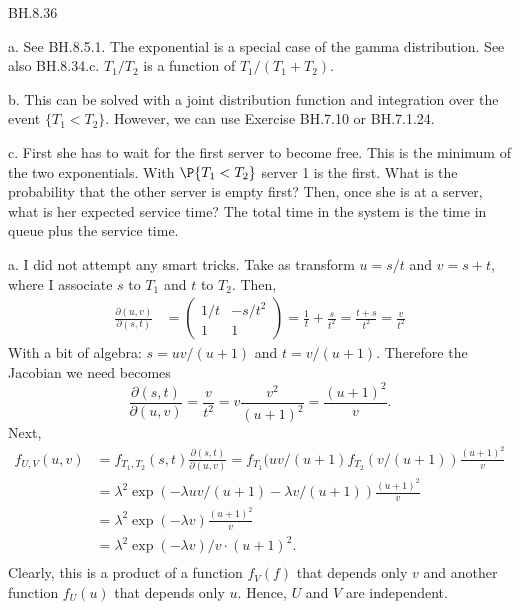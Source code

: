 
\setcounter{theorem}{35}
\begin{exercise} BH.8.36
\begin{hint}
a. See BH.8.5.1. The exponential is a special case of the gamma distribution. See also BH.8.34.c. $T_1/T_2$ is a function of $T_1/(T_1+T_2)$.

b. This can be solved with a joint distribution function and integration over the event $\{T_1<T_2\}$. However, we can use Exercise BH.7.10 or BH.7.1.24.

c. First she has to wait for the first server to become free. This is the minimum of the two exponentials.
With $\P{T_1<T_2}$ server 1 is the first.
What is the probability that the other server is empty first? Then, once she is at a server, what is her expected service time? The total time in the system is the time in queue plus the service time.
\end{hint}
\begin{solution}
a. I did not attempt any smart tricks. Take as transform $u=s/t$ and $v=s+t$, where I associate $s$ to $T_{1}$ and $t$  to $T_2$. Then,
\begin{align*}
\frac{\partial (u,v)}{\partial (s,t)} &=
  \begin{pmatrix}
    1/t & -s/t^{2} \\
1 & 1
  \end{pmatrix} = \frac 1 t + \frac{s}{t^{2}} = \frac{t+s}{t^{2}} = \frac{v}{t^{2}}
\end{align*}
With a bit of algebra: $s=uv/(u+1)$ and $t=v/(u+1)$.
Therefore the Jacobian we need becomes
\begin{equation}
\label{eq:12}
\frac{\partial (s,t)}{\partial (u,v)} = \frac{v}{t^{2}} = v \frac{v^2}{(u+1)^2} = \frac{(u+1)^{2}}{v}.
\end{equation}
Next,
\begin{align*}
  f_{U, V}(u,v) &= f_{T_1,T_2}(s,t) \frac{\partial (s,t)}{\partial (u,v)}
  =  f_{T_1}(uv/(u+1) f_{T_2}(v/(u+1)) \frac{(u+1)^{2}}{v} \\
  &=  \lambda^{2} \exp(-\lambda uv/(u+1) - \lambda v/(u+1)) \frac{(u+1)^{2}}{v} \\
  &=  \lambda^{2} \exp(-\lambda v) \frac{(u+1)^{2}}{v} \\
  &=  \lambda^{2} \exp(-\lambda v)/v \cdot  (u+1)^{2}. \\
\end{align*}
Clearly, this is a product of a function $f_{V}(f)$ that depends only  $v$ and another function $f_U(u)$ that depends  only $u$. Hence, $U$ and $V$ are independent.


\end{solution}
\end{exercise}
